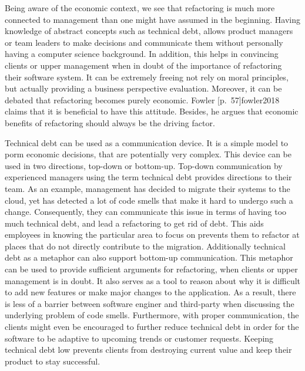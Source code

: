 Being aware of the economic context, 
	we see that refactoring is much more connected to management than one
	might have assumed in the beginning. 
Having knowledge of abstract concepts such as technical debt,
	allows product managers or team leaders 
	to make decisions and communicate them without personally 
	having a computer science background. 
In addition, 
	this helps in convincing clients or upper management 
	when in doubt of the importance of refactoring their software system.
It can be extremely freeing not rely on moral principles, 
	but actually providing a business perspective evaluation.
Moreover, it can be debated that refactoring becomes purely economic.
Fowler [p.~57]{fowler2018} claims 
	that it is beneficial to have this attitude. 
Besides, he argues that economic benefits of refactoring 
	should always be the driving factor.

Technical debt can be used as a communication device. 
It is a simple model to porm economic decisions, 
	that are potentially very complex.
This device can be used in two directions, top-down or bottom-up.
Top-down communication by experienced managers 
	using the term technical debt provides directions to their team.
As an example, management has decided to migrate their systems to the cloud, 
	yet has detected a lot of code smells 
	that make it hard to undergo such a change. 
Consequently, they can communicate this issue in terms of 
	having too much technical debt, and lead a refactoring to get rid of debt.
This aids employees in knowing the particular area 
	to focus on prevents them to refactor at places 
	that do not directly contribute to the migration.
Additionally technical debt as a metaphor 
	can also support bottom-up communication.
This metaphor can be used to provide sufficient arguments for refactoring, 
	when clients or upper management is in doubt.
It also serves as a tool to reason about 
	why it is difficult to add new features or 
	make major changes to the application. 
As a result, there is less of a barrier between 
	software enginer and third-party when discussing the 
	underlying problem of code smells. 
Furthermore, with proper communication, 
	the clients might even be encouraged to further reduce 
	technical debt in order for the software to be adaptive to 
	upcoming trends or customer requests. 
Keeping technical debt low prevents clients from destroying current value 
	and keep their product to stay successful.
